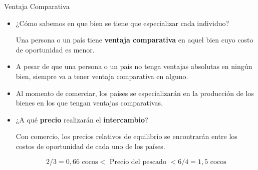 \documentclass{beamer}
\begin{document}
\begin{frame}{Ventaja Comparativa}
    \begin{itemize}
        \item ¿Cómo sabemos en que bien se tiene que especializar cada individuo?
        \begin{boxB}
            \centering
            Una persona o un país tiene \textbf{ventaja comparativa} en aquel bien cuyo costo de oportunidad es menor.
        \end{boxB}
        \item A pesar de que una persona o un país no tenga ventajas absolutas en ningún bien, siempre va a tener ventaja comparativa en alguno. 
        \item Al momento de comerciar, los países se especializarán en la producción de los bienes en los que tengan ventajas comparativas.
        \item ¿A qué \textbf{precio} realizarán el \textbf{intercambio}?
        \begin{boxB}
            \centering
            Con comercio, los precios relativos de equilibrio se encontrarán
            entre los costos de oportunidad de cada uno de los países.
        \end{boxB}
        \vspace{-8mm}
        \begin{equation*}
            2/3 = 0,66 \text{ cocos} < \text{ Precio del pescado } < 6/4 = 1,5 \text{ cocos}
        \end{equation*}
    \end{itemize}
\end{frame}
\end{document}
